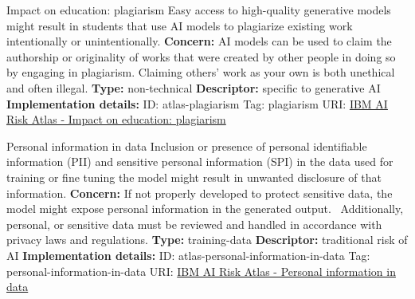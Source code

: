 \begin{definitionbox}{Impact on education: plagiarism}
Easy access to high-quality generative models might result in students that use AI models to plagiarize existing work intentionally or unintentionally.\newline\newline
\textbf{Concern: }AI models can be used to claim the authorship or originality of works that were created by other people in doing so by engaging in plagiarism. Claiming others' work as your own is both unethical and often illegal.\newline\newline
\textbf{Type: }non-technical\newline
\textbf{Descriptor: }specific to generative AI \newline\newline
\textbf{Implementation details: } \newline
ID: atlas-plagiarism \newline
Tag: plagiarism \newline
URI:  \href{https://www.ibm.com/docs/en/watsonx/saas?topic=SSYOK8/wsj/ai-risk-atlas/plagiarism.html}{IBM AI Risk Atlas - Impact on education: plagiarism}\newline
\end{definitionbox}
\begin{definitionbox}{Personal information in data}
Inclusion or presence of personal identifiable information (PII) and sensitive personal information (SPI) in the data used for training or fine tuning the model might result in unwanted disclosure of that information.\newline\newline
\textbf{Concern: }If not properly developed to protect sensitive data, the model might expose personal information in the generated output.  Additionally, personal, or sensitive data must be reviewed and handled in accordance with privacy laws and regulations.\newline\newline
\textbf{Type: }training-data\newline
\textbf{Descriptor: }traditional risk of AI \newline\newline
\textbf{Implementation details: } \newline
ID: atlas-personal-information-in-data \newline
Tag: personal-information-in-data \newline
URI:  \href{https://www.ibm.com/docs/en/watsonx/saas?topic=SSYOK8/wsj/ai-risk-atlas/personal-information-in-data.html}{IBM AI Risk Atlas - Personal information in data}\newline
\end{definitionbox}
